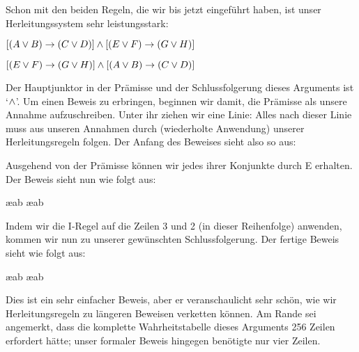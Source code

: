 Schon mit den beiden Regeln, die wir bis jetzt eingeführt haben, ist unser Herleitungssystem sehr leistungsstark:
\begin{earg}
\item[] $[(A\vee B)\rightarrow(C\vee D)] \wedge [(E \vee F) \rightarrow (G\vee H)]$
\item[\therefore] $[(E \vee F) \rightarrow (G\vee H)] \wedge [(A\vee B)\rightarrow(C\vee D)]$
\end{earg}
Der Hauptjunktor in der Prämisse und der Schlussfolgerung dieses Arguments ist `$\wedge$'. Um einen Beweis zu erbringen, beginnen wir damit, die Prämisse als unsere Annahme aufzuschreiben. Unter ihr ziehen wir eine Linie: Alles nach dieser Linie muss aus unseren Annahmen durch (wiederholte Anwendung) unserer Herleitungsregeln folgen. Der Anfang des Beweises sieht also so aus:
\begin{fitchproof}
\end{fitchproof}
Ausgehend von der Prämisse können wir jedes ihrer Konjunkte durch {\eand}E erhalten. Der Beweis sieht nun wie folgt aus:
\begin{fitchproof}
	 \ae{ab}
	 \ae{ab}
\end{fitchproof}
Indem wir die {\eand}I-Regel auf die Zeilen 3 und 2 (in dieser Reihenfolge) anwenden, kommen wir nun zu unserer gewünschten Schlussfolgerung. Der fertige Beweis sieht wie folgt aus:
\begin{fitchproof}

	 \ae{ab}
	 \ae{ab}
	 
\end{fitchproof}
Dies ist ein sehr einfacher Beweis, aber er veranschaulicht sehr schön, wie wir Herleitungsregeln zu längeren Beweisen verketten können. Am Rande sei angemerkt, dass die komplette Wahrheitstabelle dieses Arguments 256 Zeilen erfordert hätte; unser formaler Beweis hingegen benötigte nur vier Zeilen. 

